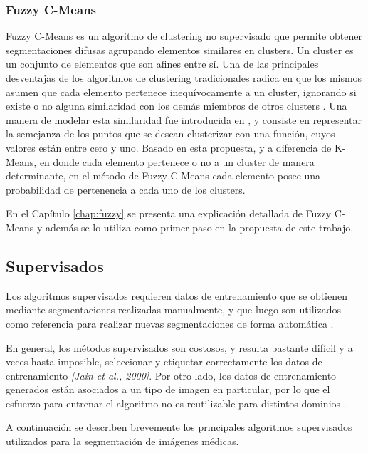\subsubsection{Fuzzy C-Means}
Fuzzy C-Means es un algoritmo de clustering no supervisado que permite obtener segmentaciones difusas agrupando elementos similares en clusters. Un cluster es un conjunto de elementos que son afines entre sí. Una de las principales desventajas de los algoritmos de clustering tradicionales radica en que los mismos asumen que cada elemento pertenece inequívocamente a un cluster, ignorando si existe o no alguna similaridad con los demás miembros de otros clusters \citep{full1982fuzzy}. Una manera de modelar esta similaridad fue introducida en \citep{zadeh1965fuzzy}, y consiste en representar la semejanza de los puntos que se desean clusterizar con una función, cuyos valores están entre cero y uno. Basado en esta propuesta, y a diferencia de K-Means, en donde cada elemento pertenece o no a un cluster de manera determinante, en el método de Fuzzy C-Means cada elemento posee una probabilidad de pertenencia a cada uno de los clusters.

En el Capítulo \ref{chap:fuzzy} se presenta una explicación detallada de Fuzzy C-Means y además se lo utiliza como primer paso en la propuesta de este trabajo.

\subsection{Supervisados}
Los algoritmos supervisados requieren datos de entrenamiento que se obtienen mediante segmentaciones realizadas manualmente, y que luego son utilizados como referencia para realizar nuevas segmentaciones de forma automática \citep{pham2000current}.

En general, los métodos supervisados son costosos, y resulta bastante difícil y a veces hasta imposible, seleccionar y etiquetar correctamente los datos de entrenamiento \emph{[Jain et al., 2000]}. Por otro lado, los datos de entrenamiento generados están asociados a un tipo de imagen en particular, por lo que el esfuerzo para entrenar el algoritmo no es reutilizable para distintos dominios \citep{sharma2010automated}.

A continuación se describen brevemente los principales algoritmos supervisados utilizados para la segmentación de imágenes médicas.

